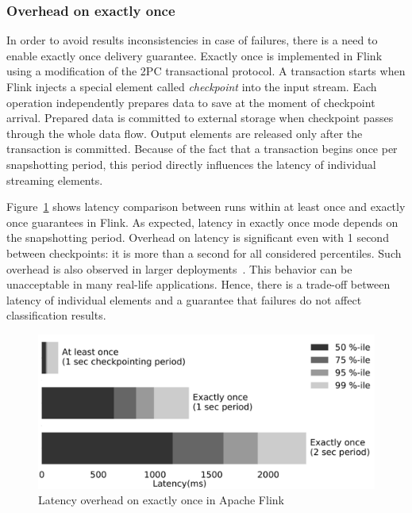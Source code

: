 \subsubsection{Overhead on exactly once}

In order to avoid results inconsistencies in case of failures, there is a need to enable exactly once delivery guarantee. 
Exactly once is implemented in Flink using a modification of the 2PC transactional protocol. A transaction starts when Flink injects a special element called {\em checkpoint} into the input stream. Each operation independently prepares data to save at the moment of checkpoint arrival. Prepared data is committed to external storage when checkpoint passes through the whole data flow. Output elements are released only after the transaction is committed. Because of the fact that a transaction begins once per snapshotting period, this period directly influences the latency of individual streaming elements.

Figure~\ref{fault_tolerance} shows latency comparison between runs within at least once and exactly once guarantees in Flink. As expected, latency in exactly once mode depends on the snapshotting period. Overhead on latency is significant even with 1 second between checkpoints: it is more than a second for all considered percentiles. Such overhead is also observed in larger deployments~\cite{we2018beyondmr}. This behavior can be unacceptable in many real-life applications. Hence, there is a trade-off between latency of individual elements and a guarantee that failures do not affect classification results.

\begin{figure}[htbp]
  \centering
  \includegraphics[scale=0.09]{pics/fault_tolerance}
  \caption{Latency overhead on exactly once in Apache Flink}
  \label {fault_tolerance}
\end{figure}


